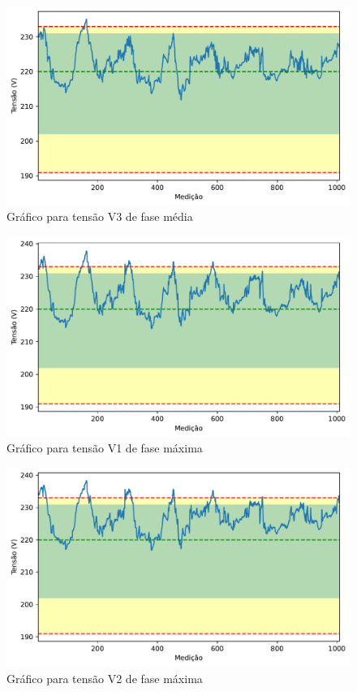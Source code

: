 \begin{figure}[H]
	\centering
	\caption{Gráfico para tensão V3 de fase média}
    \includegraphics[width=16cm]{illustrations/figures/a1_V3_Avg.pdf}
\end{figure}

\begin{figure}[H]
	\centering
	\caption{Gráfico para tensão V1 de fase máxima}
    \includegraphics[width=16cm]{illustrations/figures/a1_V1_Max.pdf}
\end{figure}

\begin{figure}[H]
	\centering
	\caption{Gráfico para tensão V2 de fase máxima}
    \includegraphics[width=16cm]{illustrations/figures/a1_V2_Max.pdf}
\end{figure}

